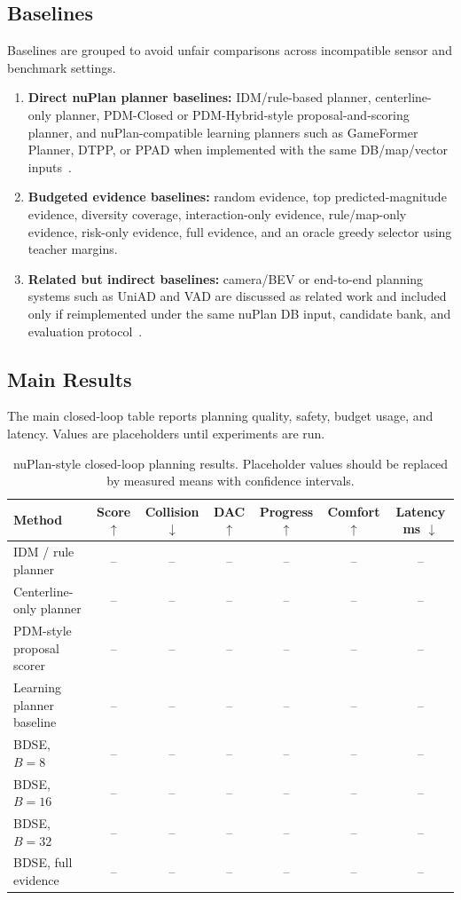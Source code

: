 \documentclass{article}
\begin{document}
\subsection{Baselines}
Baselines are grouped to avoid unfair comparisons across incompatible sensor and benchmark settings.
\begin{enumerate}[leftmargin=*]
    \item \textbf{Direct nuPlan planner baselines:} IDM/rule-based planner, centerline-only planner, PDM-Closed or PDM-Hybrid-style proposal-and-scoring planner, and nuPlan-compatible learning planners such as GameFormer Planner, DTPP, or PPAD when implemented with the same DB/map/vector inputs~\cite{huang2023gameformer,huang2024dtpp,chen2024ppad,dauner2023parting}.
    \item \textbf{Budgeted evidence baselines:} random evidence, top predicted-magnitude evidence, diversity coverage, interaction-only evidence, rule/map-only evidence, risk-only evidence, full evidence, and an oracle greedy selector using teacher margins.
    \item \textbf{Related but indirect baselines:} camera/BEV or end-to-end planning systems such as UniAD and VAD are discussed as related work and included only if reimplemented under the same nuPlan DB input, candidate bank, and evaluation protocol~\cite{hu2023uniad,jiang2023vad}.
\end{enumerate}

\subsection{Main Results}
The main closed-loop table reports planning quality, safety, budget usage, and latency. Values are placeholders until experiments are run.

\begin{table}[h]
\centering
\caption{nuPlan-style closed-loop planning results. Placeholder values should be replaced by measured means with confidence intervals.}
\label{tab:main_closed_loop}
\begin{tabular}{lcccccc}
\toprule
Method & Score $\uparrow$ & Collision $\downarrow$ & DAC $\uparrow$ & Progress $\uparrow$ & Comfort $\uparrow$ & Latency ms $\downarrow$\\
\midrule
IDM / rule planner & -- & -- & -- & -- & -- & -- \\
Centerline-only planner & -- & -- & -- & -- & -- & -- \\
PDM-style proposal scorer & -- & -- & -- & -- & -- & -- \\
Learning planner baseline & -- & -- & -- & -- & -- & -- \\
BDSE, $B=8$ & -- & -- & -- & -- & -- & -- \\
BDSE, $B=16$ & -- & -- & -- & -- & -- & -- \\
BDSE, $B=32$ & -- & -- & -- & -- & -- & -- \\
BDSE, full evidence & -- & -- & -- & -- & -- & -- \\
\bottomrule
\end{tabular}
\end{table}
\end{document}
